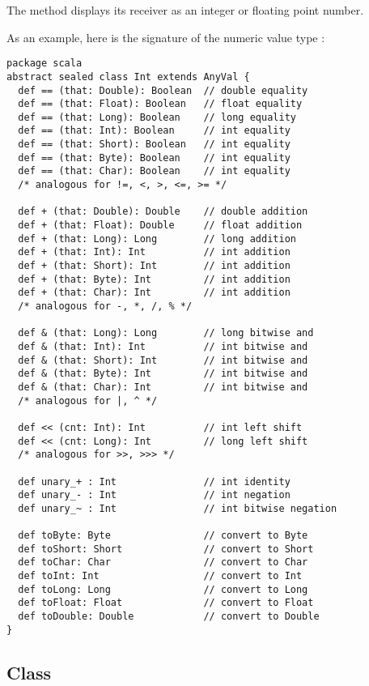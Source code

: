 The  method displays its receiver as an integer or
floating point number.

\example As an example, here is the signature of the numeric value type :

\begin{lstlisting}
package scala 
abstract sealed class Int extends AnyVal {
  def == (that: Double): Boolean  // double equality
  def == (that: Float): Boolean   // float equality
  def == (that: Long): Boolean    // long equality
  def == (that: Int): Boolean     // int equality
  def == (that: Short): Boolean   // int equality
  def == (that: Byte): Boolean    // int equality
  def == (that: Char): Boolean    // int equality
  /* analogous for !=, <, >, <=, >= */

  def + (that: Double): Double    // double addition
  def + (that: Float): Double     // float addition
  def + (that: Long): Long        // long addition
  def + (that: Int): Int          // int addition
  def + (that: Short): Int        // int addition
  def + (that: Byte): Int         // int addition
  def + (that: Char): Int         // int addition
  /* analogous for -, *, /, % */
  
  def & (that: Long): Long        // long bitwise and
  def & (that: Int): Int          // int bitwise and
  def & (that: Short): Int        // int bitwise and
  def & (that: Byte): Int         // int bitwise and
  def & (that: Char): Int         // int bitwise and
  /* analogous for |, ^ */

  def << (cnt: Int): Int          // int left shift
  def << (cnt: Long): Int         // long left shift
  /* analogous for >>, >>> */

  def unary_+ : Int               // int identity
  def unary_- : Int               // int negation
  def unary_~ : Int               // int bitwise negation

  def toByte: Byte                // convert to Byte
  def toShort: Short              // convert to Short
  def toChar: Char                // convert to Char
  def toInt: Int                  // convert to Int
  def toLong: Long                // convert to Long
  def toFloat: Float              // convert to Float
  def toDouble: Double            // convert to Double
}
\end{lstlisting}

\subsection{Class \large{}}
\label{sec:cls-boolean}

